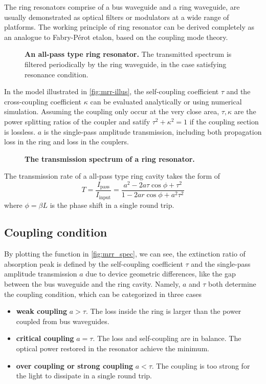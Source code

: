 The ring resonators comprise of a bus waveguide and a ring waveguide, are usually demonstrated as optical filters or modulators at a wide range of platforms. The working principle of ring resonator can be derived completely \cite{Bogaerts2012} as an analogue to Fabry-P\'{e}rot etalon, based on the coupling mode theory. 

\begin{figure}
    \centering
	
	\caption{\textbf{An all-pass type ring resonator.} The transmitted spectrum is filtered periodically by the ring waveguide, in the case satisfying resonance condition.}
    \label{fig:mrr-illus}
\end{figure}

In the model illustrated in \autoref{fig:mrr-illus}, the self-coupling coefficient $\tau$ and the cross-coupling coefficient $\kappa$ can be evaluated analytically or using numerical simulation. Assuming the coupling only occur at the very close area, $\tau,\kappa$ are the power splitting ratios of the coupler and satify $\tau^2 + \kappa^2 =1 $ if the coupling section is lossless. $a$ is the single-pass amplitude transmission, including both propagation loss in the ring and loss in the couplers.

\begin{figure}
    \centering
    
    \caption{\textbf{The transmission spectrum of a ring resonator.} }
    \label{fig:mrr_spec}
\end{figure}

The transmission rate of a all-pass type ring cavity takes the form of
\begin{equation}\label{eq:trans_phi}
    T = \frac{I_\mathrm{pass}}{I_\mathrm{input}} = \frac{a^2 - 2a\tau \cos \phi + \tau^2}{1 - 2ar \cos \phi + a^2 \tau^2}
\end{equation}
where $\phi=\beta L$ is the phase shift in a single round trip. 

\subsection{Coupling condition}

By plotting the function in \autoref{fig:mrr_spec}, we can see, the extinction ratio of absorption peak is defined by the self-coupling coefficient $\tau$ and the single-pass amplitude transmission $a$ due to device geometric differences, like the gap between the bus waveguide and the ring cavity. Namely, $a$ and $\tau$ both determine the coupling condition, which can be categorized in three cases
\begin{itemize}
    \item \textbf{weak coupling} $a>\tau$. The loss inside the ring is larger than the power coupled from bus waveguides.
    \item \textbf{critical coupling} $a=\tau$. The loss and self-coupling are in balance. The optical power restored in the resonator achieve the minimum.
    \item \textbf{over coupling or strong coupling} $a<\tau$. The coupling is too strong for the light to dissipate in a single round trip.
\end{itemize}


